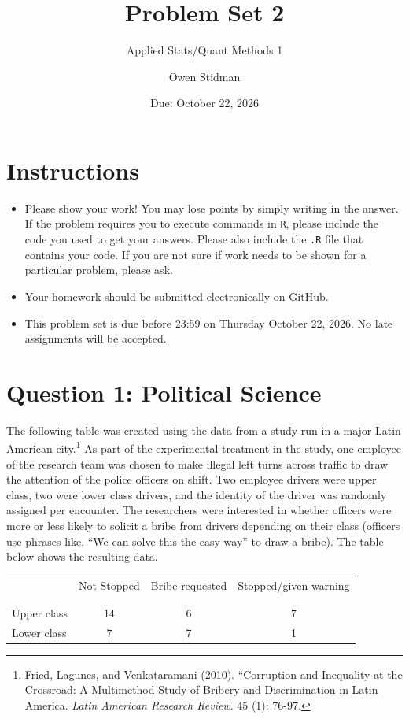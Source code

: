 \documentclass[12pt,letterpaper]{article}
\title{Problem Set 2}
\date{Due: October 22, 2026}
\author{Applied Stats/Quant Methods 1}
\author{Owen Stidman}
\begin{document}
	\maketitle
	\section*{Instructions}
\begin{itemize}
	\item Please show your work! You may lose points by simply writing in the answer. If the problem requires you to execute commands in \texttt{R}, please include the code you used to get your answers. Please also include the \texttt{.R} file that contains your code. If you are not sure if work needs to be shown for a particular problem, please ask.
	\item Your homework should be submitted electronically on GitHub.
	\item This problem set is due before 23:59 on Thursday October 22, 2026. No late assignments will be accepted.

\end{itemize}

	
	\vspace{.5cm}
	\section*{Question 1: Political Science}
		\vspace{.25cm}
	The following table was created using the data from a study run in a major Latin American city.\footnote{Fried, Lagunes, and Venkataramani (2010). ``Corruption and Inequality at the Crossroad: A Multimethod Study of Bribery and Discrimination in Latin America. \textit{Latin American Research Review}. 45 (1): 76-97.} As part of the experimental treatment in the study, one employee of the research team was chosen to make illegal left turns across traffic to draw the attention of the police officers on shift. Two employee drivers were upper class, two were lower class drivers, and the identity of the driver was randomly assigned per encounter. The researchers were interested in whether officers were more or less likely to solicit a bribe from drivers depending on their class (officers use phrases like, ``We can solve this the easy way'' to draw a bribe). The table below shows the resulting data.

\newpage
\begin{table}[h!]
	\centering
	\begin{tabular}{l | c c c }
		& Not Stopped & Bribe requested & Stopped/given warning \\
		\\[-1.8ex] 
		\hline \\[-1.8ex]
		Upper class & 14 & 6 & 7 \\
		Lower class & 7 & 7 & 1 \\
		\hline
	\end{tabular}
\end{table}
\end{document}
